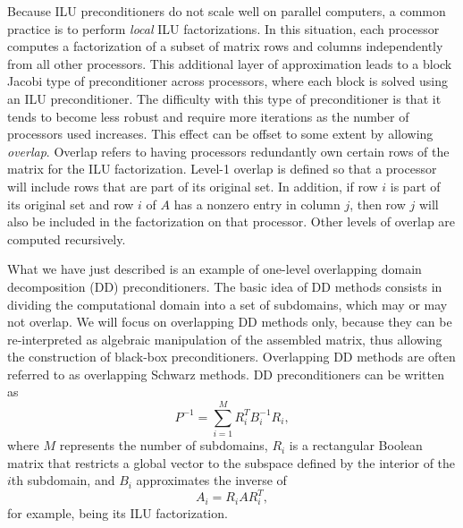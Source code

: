 \documentclass[10pt,relax]{SANDreport}
\begin{document}
Because ILU preconditioners do not scale well on parallel computers, a
common practice is to perform {\em local} ILU factorizations.  In this
situation, each processor computes a factorization of a subset of
matrix rows and columns independently from all other processors.  This
additional layer of approximation leads to a block Jacobi type of
preconditioner across processors, where each block is solved using an
ILU preconditioner.  The difficulty with this type of preconditioner
is that it tends to become less robust and require more iterations as
the number of processors used increases.  This effect can be offset to
some extent by allowing {\em overlap}.  Overlap refers to having
processors redundantly own certain rows of the matrix for the ILU
factorization.  Level-1 overlap is defined so that a processor will
include rows that are part of its original set.  In addition, if row
$i$ is part of its original set and row $i$ of $A$ has a nonzero entry
in column $j$, then row $j$ will also be included in the factorization
on that processor.  Other levels of overlap are computed recursively.

What we have just described is an example of one-level overlapping
domain decomposition (DD) preconditioners.  The basic idea of DD
methods consists in dividing the computational domain into a set of
subdomains, which may or may not overlap. We will focus on overlapping
DD methods only, because they can be re-interpreted as algebraic
manipulation of the assembled matrix, thus allowing the construction
of black-box preconditioners. Overlapping DD methods are often
referred to as overlapping Schwarz methods. DD preconditioners can be
written as
\begin{equation}
  \label{eq:prec_dd}
  P^{-1} = \sum_{i=1}^M R_i^T B_i^{-1} R_i,
\end{equation}
where $M$ represents the number of subdomains, $R_i$ is a rectangular
Boolean matrix that restricts a global vector to the subspace defined
by the interior of the $i$th subdomain, and $B_i$ approximates the
inverse of
\begin{equation}
  \label{eq:aztecoo_tilde_a}
  A_i = R_i A R_i^T ,
\end{equation}
for example, being its ILU factorization.
\end{document}
